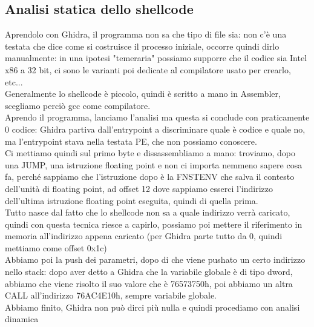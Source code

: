 \documentclass[12pt, oneside]{extbook}
\begin{document}
\subsection{Analisi statica dello shellcode}
Aprendolo con Ghidra, il programma non sa che tipo di file sia: non c'è una testata che dice come si costruisce il processo iniziale, occorre quindi dirlo manualmente: in una ipotesi "temeraria" possiamo supporre che il codice sia Intel x86 a 32 bit, ci sono le varianti poi dedicate al compilatore usato per crearlo, etc...\\Generalmente lo shellcode è piccolo, quindi è scritto a mano in Assembler, scegliamo perciò gcc come compilatore.\\Aprendo il programma, lanciamo l'analisi ma questa si conclude con praticamente 0 codice: Ghidra partiva dall'entrypoint a discriminare quale è codice e quale no, ma l'entrypoint stava nella testata PE, che non possiamo conoscere.\\Ci mettiamo quindi sul primo byte e dissassembliamo a mano: troviamo, dopo una JUMP, una istruzione floating point e non ci importa nemmeno sapere cosa fa, perché sappiamo che l'istruzione dopo è la FNSTENV che salva il contesto dell'unità di floating point, ad offset 12 dove sappiamo esserci l'indirizzo dell'ultima istruzione floating point eseguita, quindi di quella prima.\\Tutto nasce dal fatto che lo shellcode non sa a quale indirizzo verrà caricato, quindi con questa tecnica riesce a capirlo, possiamo poi mettere il riferimento in memoria all'indirizzo appena caricato (per Ghidra parte tutto da 0, quindi mettiamo come offset 0x1c)\\Abbiamo poi la push dei parametri, dopo di che viene pushato un certo indirizzo nello stack: dopo aver detto a Ghidra che la variabile globale è di tipo dword, abbiamo che viene risolto il suo valore che è 76573750h, poi abbiamo un altra CALL all'indirizzo 76AC4E10h, sempre variabile globale.\\Abbiamo finito, Ghidra non può dirci più nulla e quindi procediamo con analisi dinamica
\end{document}
